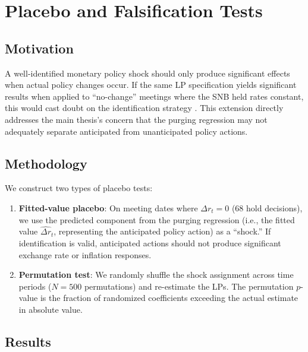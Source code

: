 \documentclass[12pt,a4paper]{article}
\begin{document}
\section{Placebo and Falsification Tests}\label{sec:placebo}

\subsection{Motivation}

A well-identified monetary policy shock should only produce significant effects when actual policy changes occur. If the same LP specification yields significant results when applied to ``no-change'' meetings where the SNB held rates constant, this would cast doubt on the identification strategy \citep{ramey2016}. This extension directly addresses the main thesis's concern that the purging regression may not adequately separate anticipated from unanticipated policy actions.

\subsection{Methodology}

We construct two types of placebo tests:

\begin{enumerate}
	\item \textbf{Fitted-value placebo}: On meeting dates where $\Delta r_t = 0$ (68 hold decisions), we use the predicted component from the purging regression (i.e., the fitted value $\hat{\Delta r}_t$, representing the anticipated policy action) as a ``shock.'' If identification is valid, anticipated actions should not produce significant exchange rate or inflation responses.

	\item \textbf{Permutation test}: We randomly shuffle the shock assignment across time periods ($N = 500$ permutations) and re-estimate the LPs. The permutation $p$-value is the fraction of randomized coefficients exceeding the actual estimate in absolute value.
\end{enumerate}

\subsection{Results}
\end{document}

